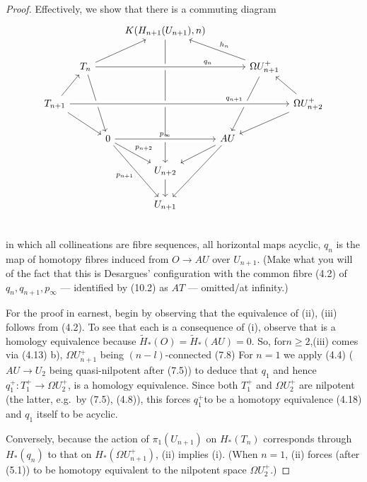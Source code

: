 \documentclass[openany,leqno]{book}  %
\begin{document}
\begin{proof}
  Effectively, we show that there is a commuting diagram 
\[\begin{tikzcd}[column sep=tiny]
  & & & K(H_{n+1}(U_{n+1}),n)\arrow{dddd} & \\
  &T_n \arrow[rru] \arrow{ddr} \arrow[rrrr,"q_n",near end,crossing over] & & & &\Omega U_{n+1}^+ \arrow[ull,"h_n"'] \arrow{ddl}\\
T_{n+1} \arrow{ru} \arrow{rrd} \arrow[rrrrrr,"q_{n+1}",near end,crossing over]& & & & & & \Omega U_{n+2}^+ \arrow{ul} \arrow{lld} \\
 & & 0 \arrow[rr,"p_{\infty}",crossing over] \arrow[rd,"p_{n+2}"] \arrow[rdd,"p_{n+1}"'] & & AU \arrow{ld} \arrow{ldd}\\
 & & & U_{n+2} \arrow{d} \\
 & & & U_{n+1} \\
\end{tikzcd}\]
in which all collineations are fibre sequences, all horizontal maps acyclic, $q_n$ is the map of homotopy fibres induced from $O \longrightarrow AU $ over $ U_{n+1}$. (Make what you will of the fact that this is Desargues' configuration with the common fibre (4.2) of $q_n, q_{n+1},p_\infty$ --- identified by (10.2) as
$AT$ --- omitted/at infinity.)

For the proof in earnest, begin by observing that the equivalence of (ii), (iii) follows from (4.2). To see that each is a consequence of (i), observe that is a homology equivalence because $\widetilde{H}_*(O) = \widetilde{H}_*(AU) = 0$. So, for$ n \geqslant 2$,(iii) comes via (4.13) b), $\Omega U_{n+1}^+$ being $(n-l)$-connected (7.8) For $n = 1$ we apply (4.4) ($AU\longrightarrow U_2$ being quasi-nilpotent after (7.5)) to deduce that $q_1$ and hence $q_1^+ \colon  T_1^+\longrightarrow \Omega U_2^+$, is a homology equivalence. Since both $T_1^+$ and $\Omega U_2^+$ are nilpotent (the latter, e.g.\  by (7.5), (4.8)), this forces $q_1^+ $to be a homotopy equivalence (4.18) and $q_1$ itself to be acyclic.

Conversely, because the action of $\pi_1(U_{n+1})$ on $H_*(T_n)$ corresponds through $H_*(q_n)$ to that on $H_*(\Omega U_{n+1}^+)$, (ii) implies (i). (When $n = 1$, (ii) forces (after (5.1)) to be homotopy equivalent to the nilpotent space $\Omega U_2^+$.)


\end{proof}
\end{document}
